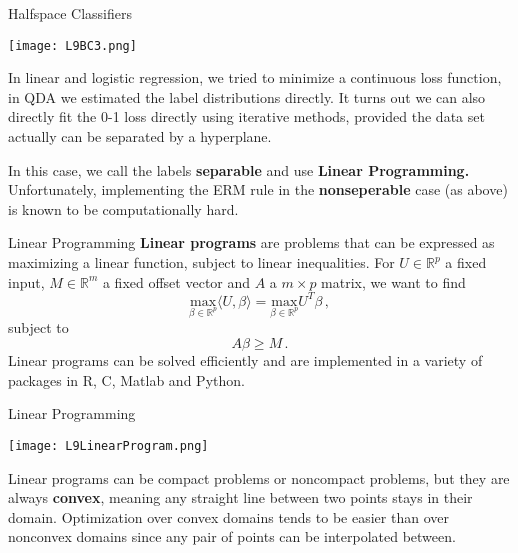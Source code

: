 \documentclass[10pt, table, dvipsnames,xcdraw, handout]{beamer}
\newcommand{\bR}{\ensuremath{\mathbb{R}}}
\begin{document}
\begin{frame}[fragile]{Halfspace Classifiers}
  \begin{minipage}[t][0.5\textheight][t]{\textwidth}
	\centering \texttt{[image: L9BC3.png]} 
  \end{minipage}
  \vfill
\begin{minipage}[t][0.5\textheight][t]{\textwidth}
In linear and logistic regression, we tried to minimize a continuous loss function, in QDA we estimated the label distributions directly. It turns out we can also directly fit the 0-1 loss directly using iterative methods, provided the data set actually can be separated by a hyperplane. 

In this case, we call the labels \textbf{separable} and use \textbf{Linear Programming.} \pause Unfortunately, implementing the ERM rule in the \textbf{nonseperable} case (as above) is known to be computationally hard.
\end{minipage}
\end{frame}



\begin{frame}[fragile]{Linear Programming}
\textbf{Linear programs} are problems that can be expressed as maximizing a linear function, subject to linear inequalities. For $U\in \bR^p$ a fixed input, $M\in \bR^m$ a fixed offset vector and $A$ a $m\times p$ matrix, we want to find 
$$
\underset{\beta\in \bR^p}{\text{max}}\langle U, \beta\rangle = \underset{\beta\in \bR^p}{\text{max}}  U^T \beta\,, 
$$
subject to 
$$
A \beta\geq M\,.
$$\pause
Linear programs can be solved efficiently and are implemented in a variety of packages in R, C, Matlab and Python. 

\end{frame}


\begin{frame}[fragile]{Linear Programming}
  \begin{minipage}[t][0.5\textheight][t]{\textwidth}
	\centering \texttt{[image: L9LinearProgram.png]} 
  \end{minipage}
  \vfill
\begin{minipage}[t][0.5\textheight][t]{\textwidth}
Linear programs can be compact problems {\color{white} or noncompact problems, but they are always \textbf{convex}, meaning any straight line between two points stays in their domain. Optimization over convex domains tends to be easier than over nonconvex domains since any pair of points can be interpolated between. }
\end{minipage}
\end{frame}
\end{document}
